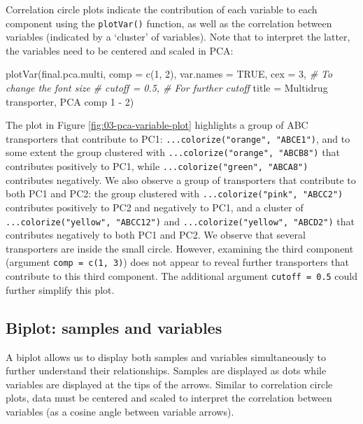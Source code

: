 \documentclass[
]{book}
\newenvironment{Shaded}{\begin{snugshade}}{\end{snugshade}}
\newcommand{\AttributeTok}[1]{\textcolor[rgb]{0.77,0.63,0.00}{#1}}
\newcommand{\CommentTok}[1]{\textcolor[rgb]{0.56,0.35,0.01}{\textit{#1}}}
\newcommand{\ConstantTok}[1]{\textcolor[rgb]{0.00,0.00,0.00}{#1}}
\newcommand{\DecValTok}[1]{\textcolor[rgb]{0.00,0.00,0.81}{#1}}
\newcommand{\FunctionTok}[1]{\textcolor[rgb]{0.00,0.00,0.00}{#1}}
\newcommand{\NormalTok}[1]{#1}
\newcommand{\StringTok}[1]{\textcolor[rgb]{0.31,0.60,0.02}{#1}}
\begin{document}
Correlation circle plots indicate the contribution of each variable to each component using the \texttt{plotVar()} function, as well as the correlation between variables (indicated by a `cluster' of variables). Note that to interpret the latter, the variables need to be centered and scaled in PCA:

\begin{Shaded}
\begin{Highlighting}[]
\FunctionTok{plotVar}\NormalTok{(final.pca.multi, }\AttributeTok{comp =} \FunctionTok{c}\NormalTok{(}\DecValTok{1}\NormalTok{, }\DecValTok{2}\NormalTok{),}
        \AttributeTok{var.names =} \ConstantTok{TRUE}\NormalTok{,}
        \AttributeTok{cex =} \DecValTok{3}\NormalTok{,         }\CommentTok{\# To change the font size}
        \CommentTok{\# cutoff = 0.5,  \# For further cutoff}
        \AttributeTok{title =} \StringTok{\textquotesingle{}Multidrug transporter, PCA comp 1 {-} 2\textquotesingle{}}\NormalTok{)}
\end{Highlighting}
\end{Shaded}



The plot in Figure \ref{fig:03-pca-variable-plot} highlights a group of ABC transporters that contribute to PC1: \texttt{...colorize("orange",\ "ABCE1")}, and to some extent the group clustered with \texttt{...colorize("orange",\ "ABCB8")} that contributes positively to PC1, while \texttt{...colorize("green",\ "ABCA8")} contributes negatively. We also observe a group of transporters that contribute to both PC1 and PC2: the group clustered with \texttt{...colorize("pink",\ "ABCC2")} contributes positively to PC2 and negatively to PC1, and a cluster of \texttt{...colorize("yellow",\ "ABCC12")} and \texttt{...colorize("yellow",\ "ABCD2")} that contributes negatively to both PC1 and PC2. We observe that several transporters are inside the small circle. However, examining the third component (argument \texttt{comp\ =\ c(1,\ 3)}) does not appear to reveal further transporters that contribute to this third component. The additional argument \texttt{cutoff\ =\ 0.5} could further simplify this plot.

\hypertarget{03:pca-biplot}{%
\subsection{Biplot: samples and variables}\label{03:pca-biplot}}

A biplot allows us to display both samples and variables simultaneously to further understand their relationships. Samples are displayed as dots while variables are displayed at the tips of the arrows. Similar to correlation circle plots, data must be centered and scaled to interpret the correlation between variables (as a cosine angle between variable arrows).
\end{document}
